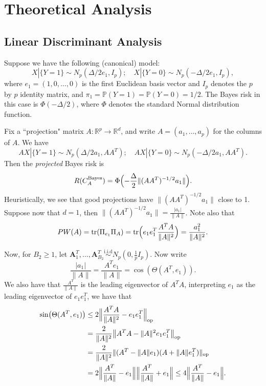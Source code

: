 \documentclass[12pt]{article}
\begin{document}
\section{Theoretical Analysis}
    


\citep{paulin_efronstein_2016}

\subsection{Linear Discriminant Analysis}
Suppose we have the following (canonical) model:
\[
X | \{Y = 1\} \sim N_p(\Delta/2 e_1, I_p); \quad X | \{Y = 0\} \sim N_p(-\Delta/2 e_1, I_p),
\]
where $e_1 = (1, 0, \ldots, 0)$ is the first Euclidean basis vector and $I_p$ denotes the $p$ by $p$ identity matrix, and $\pi_1 = \mathbb{P}(Y=1) = \mathbb{P}(Y=0) = 1/2$. The Bayes risk in this case is $\Phi(-\Delta/2)$, where $\Phi$ denotes the standard Normal distribution function. 

Fix a ``projection" matrix $A: \mathbb{R}^p \rightarrow \mathbb{R}^d$, and write $A = (a_1, \ldots, a_p)$ for the columns of $A$. We have 
\[
AX | \{Y = 1\} \sim N_p(\Delta/2 a_1, AA^T); \quad AX | \{Y = 0\} \sim N_p(-\Delta/2 a_1, AA^T). 
\] 
Then the \emph{projected} Bayes risk is 
\[
R(C_{A}^{\mathrm{Bayes}}) = \Phi\Bigl(-\frac{\Delta}{2} \|(AA^T)^{-1/2} a_1 \| \Bigr).
\]
Heuristically, we see that good projections have $\|(AA^T)^{-1/2} a_1\|$ close to 1.  Suppose now that $d =1$, then $\|(AA^T)^{-1/2} a_1\| = \frac{|a_1|}{\|A\|}$. Note also that 
\[   
PW(A)   = \mathrm{tr}(\Pi_{e_1}\Pi_{A}) = \mathrm{tr}\Bigl(e_1e_1^T\frac{A^TA}{\|A\|^2}\Bigr)  =  \frac{a_1^2}{\|A\|^2}.
\]  

Now, for $B_2 \geq 1$, let $\mathbf{A}_1^T, \ldots, \mathbf{A}_{B_2}^T \stackrel{\mathrm{i.i.d}}{\sim} N_p(0, \frac{1}{p} I_p)$. Now write
\[
 \frac{|a_1|}{\|A\|} = \frac{A^T e_1 } {\|A\|} = \cos(\Theta(A^T, e_1)). 
\] 
We also have that $\frac{A^T}{\|A\|}$ is the leading eigenvector of $A^TA$, interpreting $e_1$ as the leading eigenvector of $e_1e_1^T$, we have that 
\begin{align*}
\sin\bigl(\Theta(A^T, e_1)\bigr) &\leq 2\Bigl\|\frac{A^TA}{\|A\|^2} -  e_1e_1^T\Bigr\|_{\mathrm{op} } 
\\ & = \frac{ 2}{\|A\|^2} \bigl\| A^TA - \|A\|^2 e_1e_1^T \bigr\|_{\mathrm{op}} 
\\ & = \frac{2}{\|A\|^2} \| (A^T - \|A\|e_1)(A + \|A\|e_1^T)\|_{\mathrm{op}} 
\\ & = 2\Bigl\|\frac{A^T}{\|A\|} - e_1\Bigr\|\Bigl\|\frac{A^T}{\|A\|} + e_1\Bigr\| \leq 4 \Bigl\|\frac{A^T}{\|A\|} - e_1\Bigr\|.  
\end{align*} 
\end{document}
